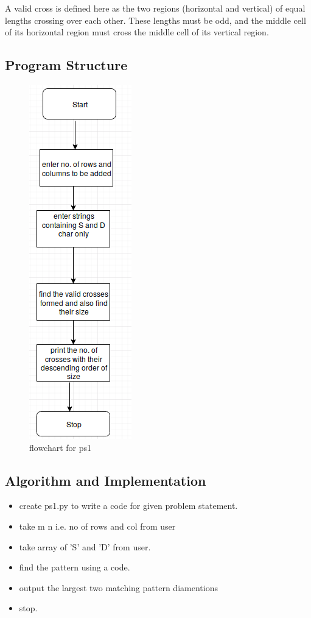 \documentclass[a4paper,12pt]{article}
\begin{document}
	A valid cross is defined here as the two regions (horizontal and vertical) of equal lengths crossing over each other. These lengths must be odd, and the middle cell of its horizontal region must cross the middle cell of its vertical region.\\
	
	

	\subsection{Program Structure}
	
	
	\begin{figure}[h]
		\includegraphics[scale=0.45]{flow1.png}
		\caption{flowchart for ps1}
		\label{fig:flow}
	\end{figure}

	
	\subsection{Algorithm and Implementation}
	\begin{itemize}
		\item create ps1.py to write a code for given problem statement.
		\item take m n i.e. no of rows and col from user
		\item take array of 'S' and 'D' from user.
		\item find the pattern using a code.
		\item output the largest two matching pattern diamentions
		\item stop.
   \end{itemize}
\end{document}

